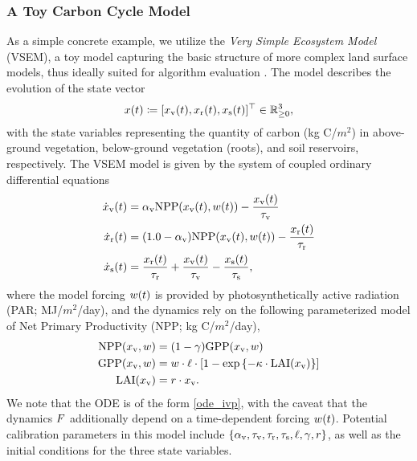 \documentclass[12pt]{article}
\begin{document}
\subsubsection{A Toy Carbon Cycle Model}
As a simple concrete example, we utilize the \textit{Very Simple Ecosystem Model} (VSEM), a toy model capturing the basic 
structure of more complex land surface models, thus ideally suited for algorithm evaluation \citep{vsem}. The model 
describes the evolution of the state vector
\begin{align*}
x(t) \coloneqq [x_{\textrm{v}}(t), x_{\textrm{r}}(t), x_{\textrm{s}}(t)]^\top \in \mathbb{R}_{\geq 0}^{3}, 
\end{align*}
with the state variables representing the quantity of carbon (\textrm{kg C/$m^2$}) in above-ground vegetation, below-ground 
vegetation (roots), and soil reservoirs, respectively. The VSEM model is given by the system of coupled 
ordinary differential equations
\begin{align}
\dot{x}_{\textrm{v}}(t) &= \alpha_{\textrm{v}} \textrm{NPP}(x_{\textrm{v}}(t), w(t)) - \frac{x_{\textrm{v}}(t)}{\tau_{\textrm{v}}} \\
\dot{x}_{\textrm{r}}(t) &= (1.0 - \alpha_{\textrm{v}}) \textrm{NPP}(x_{\textrm{v}}(t), w(t)) - \frac{x_{\textrm{r}}(t)}{\tau_{\textrm{r}}} \nonumber \\ 
\dot{x}_{\textrm{s}}(t) &= \frac{x_{\textrm{r}}(t)}{\tau_{\textrm{r}}} + \frac{x_{\textrm{v}}(t)}{\tau_{\textrm{v}}} - \frac{x_{\textrm{s}}(t)}{\tau_{\textrm{s}}}, \nonumber
\end{align}
where the model forcing $w(t)$ is provided by photosynthetically active radiation 
(PAR; \textrm{MJ/$m^2$/day}), and the dynamics rely on the following parameterized model of 
Net Primary Productivity (NPP; \textrm{kg C/$m^2$/day}),
\begin{align}
\textrm{NPP}(x_{\textrm{v}}, w) &= (1 - \gamma) \textrm{GPP}(x_{\textrm{v}}, w) \\
\textrm{GPP}(x_{\textrm{v}}, w) &= w \cdot \ell \cdot \left[1 - \exp\left\{-\kappa \cdot \textrm{LAI}(x_{\textrm{v}}) \right\} \right] \nonumber \\
\textrm{LAI}(x_{\textrm{v}}) &= r \cdot x_{\textrm{v}}. \nonumber
\end{align} 
We note that the ODE is of the form \ref{ode_ivp}, with the caveat that the dynamics $F$ additionally depend on a 
time-dependent forcing $w(t)$. Potential calibration parameters in this model include 
$\{\alpha_{\textrm{v}}, \tau_{\textrm{v}}, \tau_{\textrm{r}}, \tau_{\textrm{s}}, \ell, \gamma, r\}$, as well as the initial conditions for the three state variables.
 
\end{document}
